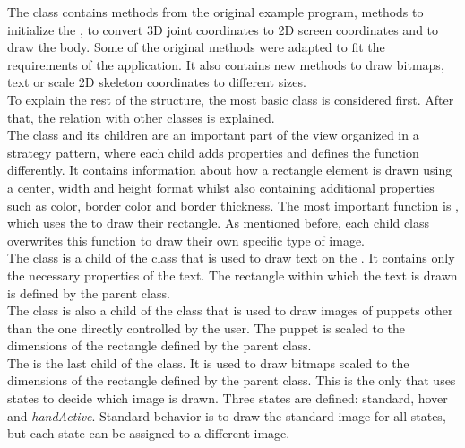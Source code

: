 The  class contains methods from the original example program, methods to initialize the , to convert 3D joint coordinates to 2D screen coordinates and to draw the body. Some of the original methods were adapted to fit the requirements of the application. It also contains new methods to draw bitmaps, text or scale 2D skeleton coordinates to different sizes.\\

To explain the rest of the structure, the most basic class is considered first. After that, the relation with other classes is explained.\\

The  class and its children are an important part of the view organized in a strategy pattern, where each child adds properties and defines the  function differently. It contains information about how a rectangle element is drawn using a center, width and height format whilst also containing additional properties such as color, border color and border thickness. The most important function is , which uses the  to draw their rectangle. As mentioned before, each child class overwrites this function to draw their own specific type of image.\\

The  class is a child of the  class that is used to draw text on the . It contains only the necessary properties of the text. The rectangle within which the text is drawn is defined by the parent class.\\

The  class is also a child of the  class that is used to draw images of puppets other than the one directly controlled by the user. The puppet is scaled to the dimensions of the rectangle defined by the parent class.\\

The  is the last child of the  class. It is used to draw bitmaps scaled to the dimensions of the rectangle defined by the parent class. This is the only  that uses states to decide which image is drawn. Three states are defined: standard, hover and \emph{handActive}. Standard behavior is to draw the standard image for all states, but each state can be assigned to a different image.\\

